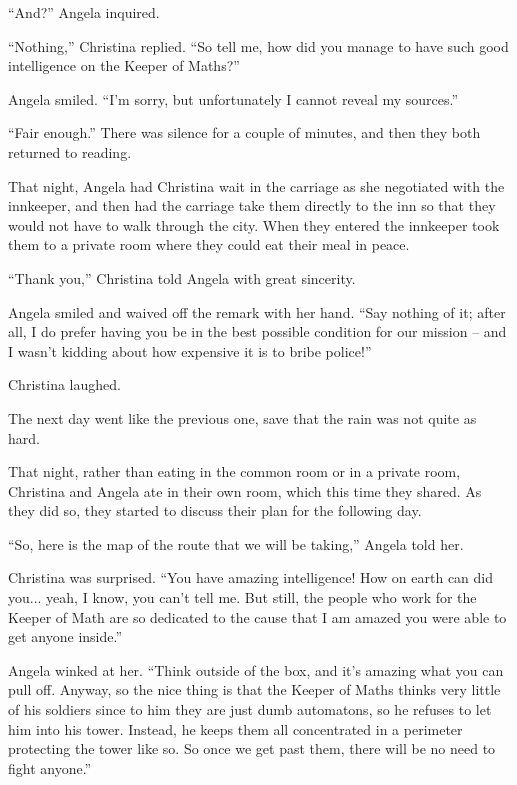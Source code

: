 \documentclass[showtrims,b6paper,draft,10pt]{memoir}
\begin{document}
``And?''  Angela inquired.

``Nothing,''  Christina replied.  ``So tell me, how did you manage to have such good intelligence on the Keeper of Maths?''

Angela smiled.  ``I'm sorry, but unfortunately I cannot reveal my sources.''

``Fair enough.''  There was silence for a couple of minutes, and then they both returned to reading.

\timeskip
That night, Angela had Christina wait in the carriage as she negotiated with the innkeeper, and then had the carriage take them directly to the inn so that they would not have to walk through the city.  When they entered the innkeeper took them to a private room where they could eat their meal in peace.

``Thank you,'' Christina told Angela with great sincerity.

Angela smiled and waived off the remark with her hand.  ``Say nothing of it;  after all, I do prefer having you be in the best possible condition for our mission -- and I wasn't kidding about how expensive it is to bribe police!''

Christina laughed.

\timeskip
The next day went like the previous one, save that the rain was not quite as hard.

That night, rather than eating in the common room or in a private room, Christina and Angela ate in their own room, which this time they shared.  As they did so, they started to discuss their plan for the following day.

``So, here is the map of the route that we will be taking,'' Angela told her.

Christina was surprised.  ``You have amazing intelligence!  How on earth can did you... yeah, I know, you can't tell me.  But still, the people who work for the Keeper of Math are so dedicated to the cause that I am amazed you were able to get anyone inside.''

Angela winked at her.  ``Think outside of the box, and it's amazing what you can pull off.  Anyway, so the nice thing is that the Keeper of Maths thinks very little of his soldiers since to him they are just dumb automatons, so he refuses to let him into his tower.  Instead, he keeps them all concentrated in a perimeter protecting the tower like so.  So once we get past them, there will be no need to fight anyone.''
\end{document}

